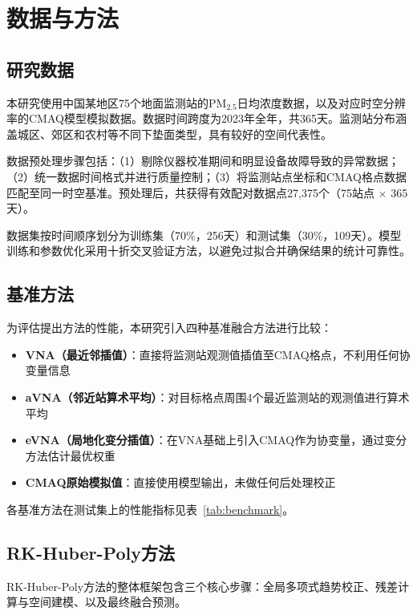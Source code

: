 \documentclass[UTF8, a4paper, 12pt]{article}
\begin{document}
\section{数据与方法}

\subsection{研究数据}

本研究使用中国某地区75个地面监测站的PM$_{2.5}$日均浓度数据，以及对应时空分辨率的CMAQ模型模拟数据。数据时间跨度为2023年全年，共365天。监测站分布涵盖城区、郊区和农村等不同下垫面类型，具有较好的空间代表性。

数据预处理步骤包括：（1）剔除仪器校准期间和明显设备故障导致的异常数据；（2）统一数据时间格式并进行质量控制；（3）将监测站点坐标和CMAQ格点数据匹配至同一时空基准。预处理后，共获得有效配对数据点27,375个（75站点 $\times$ 365天）。

数据集按时间顺序划分为训练集（70\%，256天）和测试集（30\%，109天）。模型训练和参数优化采用十折交叉验证方法，以避免过拟合并确保结果的统计可靠性。

\subsection{基准方法}

为评估提出方法的性能，本研究引入四种基准融合方法进行比较：

\begin{itemize}
    \item \textbf{VNA（最近邻插值）}：直接将监测站观测值插值至CMAQ格点，不利用任何协变量信息
    \item \textbf{aVNA（邻近站算术平均）}：对目标格点周围4个最近监测站的观测值进行算术平均
    \item \textbf{eVNA（局地化变分插值）}：在VNA基础上引入CMAQ作为协变量，通过变分方法估计最优权重
    \item \textbf{CMAQ原始模拟值}：直接使用模型输出，未做任何后处理校正
\end{itemize}

各基准方法在测试集上的性能指标见表~\ref{tab:benchmark}。

\subsection{RK-Huber-Poly方法}

RK-Huber-Poly方法的整体框架包含三个核心步骤：全局多项式趋势校正、残差计算与空间建模、以及最终融合预测。
\end{document}
